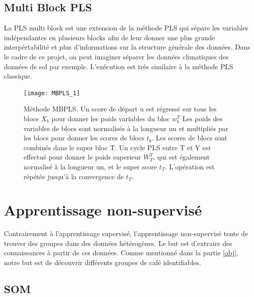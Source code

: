 \subsection{Multi Block PLS} 



La PLS multi block est une extension de la méthode PLS qui sépare les variables indépendantes en plusieurs blocks afin de leur donner une plus grande interpértabilité et plus d'informations sur la structure générale des données. Dans le cadre de ce projet, on peut imaginer séparer les données climatiques des données de sol par exemple.   
L'exécution est très similaire à la méthode PLS classique.  

\begin{figure}[H] 
	\centering
	\texttt{[image: MBPLS\_1]} 
	\caption{\label{MBPLSschema} Méthode MBPLS. Un score de départ u est régressé sur tous les blocs $ X_b $ pour donner les poids variables du bloc $ w^T_b $ Les poids des variables de blocs sont normalisés à la longueur un et multipliés par les blocs pour donner les scores de blocs $ t_b $.  Les scores de blocs sont combinés dans le super bloc T. Un cycle PLS entre T et Y est effectué pour donner le poids superieur $ W^T_T $, qui est également normalisé à la longueur un, et le super score $ t_T $. L'opération est répétée jusqu'à la convergence de $ t_T $. \cite{CEM:CEM515}} 
\end{figure} 






\newpage

\section{Apprentissage non-supervisé}
Contrairement à l'apprentissage supervisé, l'apprentissage non-supervisé tente de trouver des groupes dans des données hétérogènes. Le but est d'extraire des connaissances à partir de ces données. Comme mentionné dans la partie \ref{obj}, notre but est de découvrir différents groupes de café identifiables. 


\subsection{SOM}


